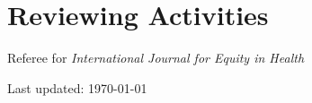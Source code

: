 \documentclass[a4paper,10pt]{article}
\begin{document}
\section{Reviewing Activities}
Referee for \emph{International Journal for Equity in Health}\\




\vfill{}
\begin{center}
{\scriptsize  Last updated: \today\- }
\end{center}
\end{document}
